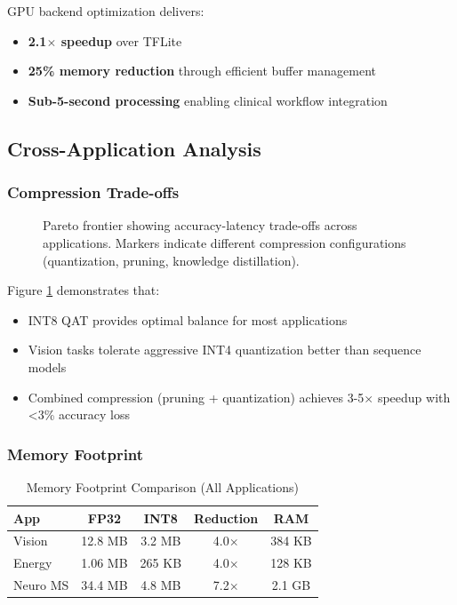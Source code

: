 GPU backend optimization delivers:
\begin{itemize}
\item \textbf{2.1$\times$ speedup} over TFLite
\item \textbf{25\% memory reduction} through efficient buffer management
\item \textbf{Sub-5-second processing} enabling clinical workflow integration
\end{itemize}

\subsection{Cross-Application Analysis}

\subsubsection{Compression Trade-offs}

\begin{figure}[h]
\centering
\resizebox{0.48\textwidth}{!}{}
\caption{Pareto frontier showing accuracy-latency trade-offs across applications. Markers indicate different compression configurations (quantization, pruning, knowledge distillation).}
\label{fig:pareto}
\end{figure}

Figure \ref{fig:pareto} demonstrates that:
\begin{itemize}
\item INT8 QAT provides optimal balance for most applications
\item Vision tasks tolerate aggressive INT4 quantization better than sequence models
\item Combined compression (pruning + quantization) achieves 3-5$\times$ speedup with <3\% accuracy loss
\end{itemize}

\subsubsection{Memory Footprint}

\begin{table}[h]
\centering
\caption{Memory Footprint Comparison (All Applications)}
\label{tab:memory}
\begin{tabular}{lcccc}
\hline
\textbf{App} & \textbf{FP32} & \textbf{INT8} & \textbf{Reduction} & \textbf{RAM} \\
\hline
Vision & 12.8 MB & 3.2 MB & 4.0$\times$ & 384 KB \\
Energy & 1.06 MB & 265 KB & 4.0$\times$ & 128 KB \\
Neuro MS & 34.4 MB & 4.8 MB & 7.2$\times$ & 2.1 GB \\
\hline
\end{tabular}
\end{table}

